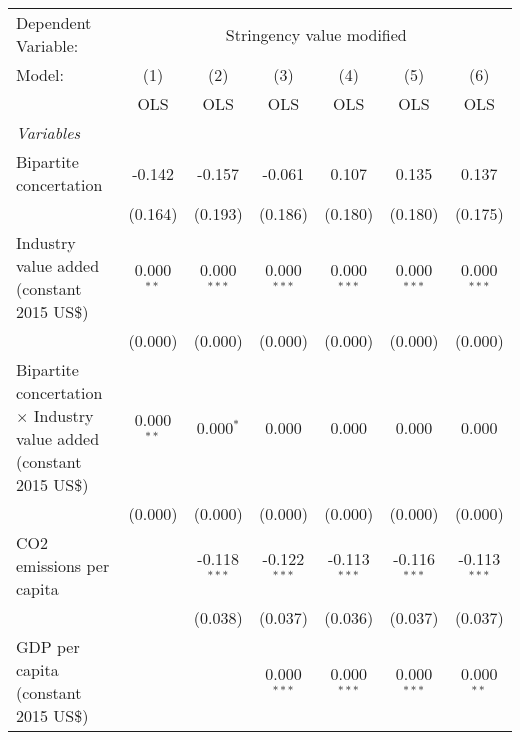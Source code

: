 
\begingroup
\centering
\begin{tabular}{lcccccc}
   \toprule
   Dependent Variable: & \multicolumn{6}{c}{Stringency value modified}\\
   Model:                                                                      & (1)          & (2)            & (3)            & (4)            & (5)            & (6)\\  
                                                                               &  OLS         & OLS            & OLS            & OLS            & OLS            & OLS\\  
   \midrule
   \emph{Variables}\\
   Bipartite concertation                                                      & -0.142       & -0.157         & -0.061         & 0.107          & 0.135          & 0.137\\   
                                                                               & (0.164)      & (0.193)        & (0.186)        & (0.180)        & (0.180)        & (0.175)\\   
   Industry value added (constant 2015 US\$)                                   & 0.000$^{**}$ & 0.000$^{***}$  & 0.000$^{***}$  & 0.000$^{***}$  & 0.000$^{***}$  & 0.000$^{***}$\\   
                                                                               & (0.000)      & (0.000)        & (0.000)        & (0.000)        & (0.000)        & (0.000)\\   
   Bipartite concertation $\times$ Industry value added (constant 2015 US\$)   & 0.000$^{**}$ & 0.000$^{*}$    & 0.000          & 0.000          & 0.000          & 0.000\\   
                                                                               & (0.000)      & (0.000)        & (0.000)        & (0.000)        & (0.000)        & (0.000)\\   
   CO2 emissions per capita                                                    &              & -0.118$^{***}$ & -0.122$^{***}$ & -0.113$^{***}$ & -0.116$^{***}$ & -0.113$^{***}$\\   
                                                                               &              & (0.038)        & (0.037)        & (0.036)        & (0.037)        & (0.037)\\   
   GDP per capita (constant 2015 US\$)                                         &              &                & 0.000$^{***}$  & 0.000$^{***}$  & 0.000$^{***}$  & 0.000$^{**}$\\   

\end{tabular}
